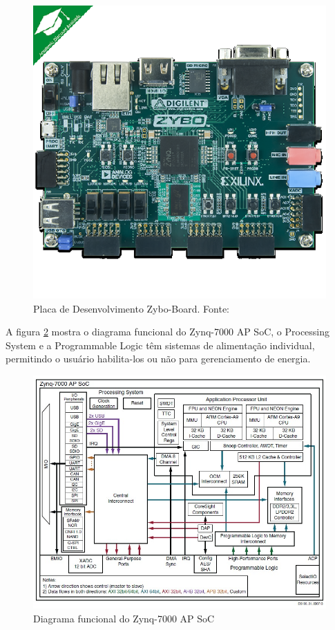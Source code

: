 \begin{figure}[h]
	\centering
	\includegraphics[keepaspectratio=true,scale=1.0]{figuras/zyboboard.eps}
	\caption{Placa de Desenvolvimento Zybo-Board. Fonte: \cite{DigilentZybo}}
	\label{Zybo Board}
\end{figure}

A figura \ref{diaagrama-zynq} mostra o diagrama funcional do Zynq-7000 AP SoC, o Processing System e a Programmable Logic têm sistemas de alimentação individual, permitindo o usuário habilita-los ou não para gerenciamento de energia. 
\begin{figure}[h]
	\centering
	\includegraphics[keepaspectratio=true,scale=0.6]{figuras/diagrama-zinq.jpeg}
	\caption{Diagrama funcional do Zynq-7000 AP SoC }
	\label{diaagrama-zynq}
\end{figure}

